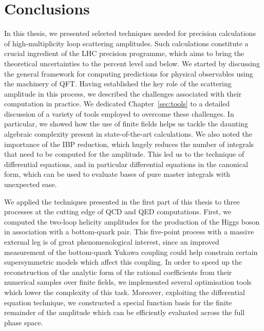 \documentclass[main.tex]{subfiles}
\begin{document}
\chapter{Conclusions} \label{sec:conclusions}
In this thesis, we presented selected techniques needed for precision calculations of high-multiplicity loop scattering amplitudes. Such calculations constitute a crucial ingredient of the LHC precision programme, which aims to bring the theoretical uncertainties to the percent level and below. We started by discussing the general framework for computing predictions for physical observables using the machinery of QFT. Having established the key role of the scattering amplitude in this process, we described the challenges associated with their computation in practice. We dedicated Chapter~\ref{sec:tools} to a detailed discussion of a variety of tools employed to overcome these challenges. In particular, we showed how the use of finite fields helps us tackle the daunting algebraic complexity present in state-of-the-art calculations. We also noted the importance of the IBP reduction, which hugely reduces the number of integrals that need to be computed for the amplitude. This led us to the technique of differential equations, and in particular differential equations in the canonical form, which can be used to evaluate bases of pure master integrals with unexpected ease.

We applied the techniques presented in the first part of this thesis to three processes at the cutting edge of QCD and QED computations. First, we computed the two-loop helicity amplitudes for the production of the Higgs boson in association with a bottom-quark pair. This five-point process with a massive external leg is of great phenomenological interest, since an improved measurement of the bottom-quark Yukawa coupling could help constrain certain supersymmetric models which affect this coupling. In order to speed up the reconstruction of the analytic form of the rational coefficients from their numerical samples over finite fields, we implemented several optimisation tools which lower the complexity of this task. Moreover, exploiting the differential equation technique, we constructed a special function basis for the finite remainder of the amplitude which can be efficiently evaluated across the full phase space.
\end{document}
